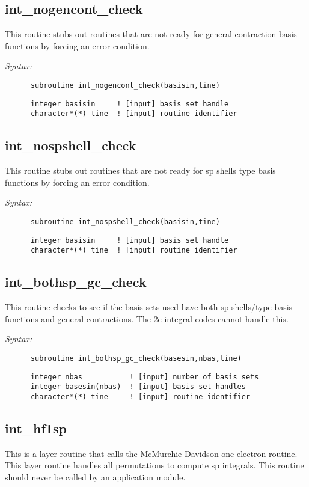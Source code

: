 \subsection{int\_nogencont\_check} 
This routine stubs out routines that are not ready for  
general contraction basis functions by forcing an error  
condition. 
 
{\it Syntax:} 
\begin{verbatim} 
      subroutine int_nogencont_check(basisin,tine) 
\end{verbatim} 
\begin{verbatim} 
      integer basisin     ! [input] basis set handle 
      character*(*) tine  ! [input] routine identifier 
\end{verbatim} 
\subsection{int\_nospshell\_check} 
This routine stubs out routines that are not ready for  
sp shells type basis functions by forcing an error  
condition. 
 
{\it Syntax:} 
\begin{verbatim} 
      subroutine int_nospshell_check(basisin,tine) 
\end{verbatim} 
\begin{verbatim} 
      integer basisin     ! [input] basis set handle 
      character*(*) tine  ! [input] routine identifier 
\end{verbatim} 
\subsection{int\_bothsp\_gc\_check} 
This routine checks to see if the basis sets used 
have both sp shells/type basis functions and general 
contractions.  The 2e integral codes cannot handle this. 
 
{\it Syntax:} 
\begin{verbatim} 
      subroutine int_bothsp_gc_check(basesin,nbas,tine) 
\end{verbatim} 
\begin{verbatim} 
      integer nbas           ! [input] number of basis sets 
      integer basesin(nbas)  ! [input] basis set handles 
      character*(*) tine     ! [input] routine identifier 
\end{verbatim} 
\subsection{int\_hf1sp} 
This is a layer routine that calls the  
McMurchie-Davidson one electron routine.  This layer 
routine handles all permutations to compute sp integrals. 
This routine should never be called by an application module. 
 
